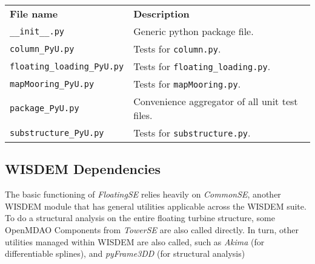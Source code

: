 {\small
  \begin{tabularx}{\linewidth}{ l X }
    \textbf{File name} & \textbf{Description} \\
\texttt{\_\_init\_\_.py} & Generic python package file.\\
\texttt{column\_PyU.py} & Tests for \texttt{column.py}.\\
\texttt{floating\_loading\_PyU.py} & Tests for \texttt{floating\_loading.py}.\\
\texttt{mapMooring\_PyU.py} & Tests for \texttt{mapMooring.py}.\\
\texttt{package\_PyU.py} & Convenience aggregator of all unit test files.\\
\texttt{substructure\_PyU.py} & Tests for \texttt{substructure.py}.\\
\end{tabularx}
}

\subsection{WISDEM Dependencies}
The basic functioning of \textit{FloatingSE} relies heavily on \textit{CommonSE}, another
WISDEM module that has general utilities applicable across the WISDEM
suite.  To do a structural analysis on the entire floating turbine
structure, some OpenMDAO Components from \textit{TowerSE} are also called
directly.  In turn, other utilities managed within WISDEM are also
called, such as \textit{Akima} (for differentiable splines), and \textit{pyFrame3DD} (for
structural analysis)
